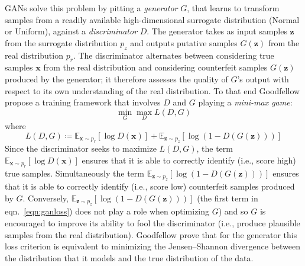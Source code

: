 GANs solve this problem by pitting a \textit{generator} \(G\), that learns to transform samples from a readily available high-dimensional surrogate distribution (Normal or Uniform), against a \textit{discriminator} \(D\).
The generator takes as input samples \(\bm{z}\) from the surrogate distribution \(p_{z}\) and outputs putative samples \(G(\bm{z})\) from the real distribution \(p_r\).
%
The discriminator alternates between considering true samples \(\bm{x}\) from the real distribution and considering counterfeit samples \(G(\bm{z})\) produced by the generator; it therefore assesses the quality of \(G\)'s output with respect to its own understanding of the real distribution.
%
To that end Goodfellow \etal \cite{goodfellow2014generative} propose a training framework that involves \(D\) and \(G \) playing a \textit{mini-max game}:
\begin{equation}
    \min_G \max_D L(D, G)
\end{equation}
where
\begin{equation}
    L(D, G) \coloneqq \mathbb{E}_{\bm{x} \sim p_{r}} [\log D(\bm{x})] + \mathbb{E}_{\bm{z} \sim p_{z} } [\log(1 - D(G(\bm{z})))]
    \label{eqn:ganloss}
\end{equation}
Since the discriminator seeks to maximize \(L(D, G)\), the term \(\mathbb{E}_{\bm{x} \sim p_{r}} [\log D(\bm{x})]\) ensures that it is able to correctly identify (i.e., score high) true samples.
%
Simultaneously the term \(\mathbb{E}_{\bm{z} \sim p_{z} } [\log(1 - D(G(\bm{z})))] \) ensures that it is able to correctly identify (i.e., score low) counterfeit samples produced by \(G\).
%
Conversely, \(\mathbb{E}_{\bm{z} \sim p_{z} } [\log(1 - D(G(\bm{z})))]\) (the first term in eqn.~\eqref{eqn:ganloss}) does not play a role when optimizing \(G\)) and so \(G\) is encouraged to improve its ability to fool the discriminator (i.e., produce plausible samples from the real distribution).
%
Goodfellow \etal prove that for the generator this loss criterion is equivalent to minimizing the Jensen–Shannon divergence between the distribution that it models and the true distribution of the data.
